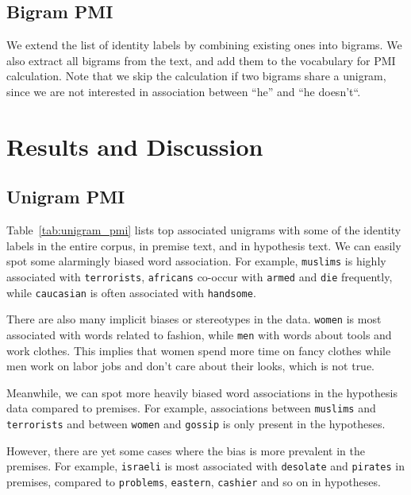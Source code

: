 \documentclass[11pt]{article}
\begin{document}
    \subsection{Bigram PMI}

    We extend the list of identity labels by combining existing ones into bigrams.
    We also extract all bigrams from the text, and add them to the vocabulary for PMI calculation.
    Note that we skip the calculation if two bigrams share a unigram, since we are not interested in association
    between ``he'' and ``he doesn't``.


    \section{Results and Discussion}

    \subsection{Unigram PMI}

    Table~\ref{tab:unigram_pmi} lists top associated unigrams with some of the identity labels in the entire corpus,
    in premise text, and in hypothesis text.
    We can easily spot some alarmingly biased word association.
    For example, \texttt{muslims} is highly associated with \texttt{terrorists}, \texttt{africans} co-occur with
    \texttt{armed} and \texttt{die} frequently, while \texttt{caucasian} is often associated with \texttt{handsome}.

    There are also many implicit biases or stereotypes in the data.
    \texttt{women} is most associated with words related to fashion, while \texttt{men} with words about
    tools and work clothes.
    This implies that women spend more time on fancy clothes while men work on labor
    jobs and don't care about their looks, which is not true.

    Meanwhile, we can spot more heavily biased word associations in the hypothesis data compared to premises.
    For example, associations between \texttt{muslims} and \texttt{terrorists} and between
    \texttt{women} and \texttt{gossip} is only present in the hypotheses.

    However, there are yet some cases where the bias is more prevalent in the premises.
    For example, \texttt{israeli} is most associated with \texttt{desolate} and \texttt{pirates} in premises,
    compared to \texttt{problems}, \texttt{eastern}, \texttt{cashier} and so on in hypotheses.
\end{document}
